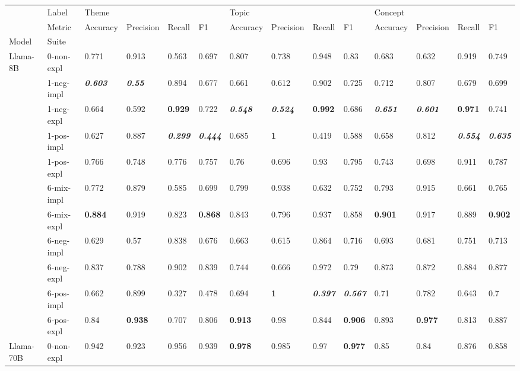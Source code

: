 \begin{tabular}{ll|llll|llll|llll}
\toprule
 & Label & \multicolumn{4}{l}{Theme} & \multicolumn{4}{l}{Topic} & \multicolumn{4}{l}{Concept} \\
 & Metric & Accuracy & Precision & Recall & F1 & Accuracy & Precision & Recall & F1 & Accuracy & Precision & Recall & F1 \\
Model & Suite &  &  &  &  &  &  &  &  &  &  &  &  \\
\midrule
\multirow[t]{11}{*}{Llama-8B} & 0-non-expl & 0.771 & 0.913 & 0.563 & 0.697 & 0.807 & 0.738 & 0.948 & 0.83 & 0.683 & 0.632 & 0.919 & 0.749 \\
 & 1-neg-impl & \bfseries \itshape 0.603 & \bfseries \itshape 0.55 & 0.894 & 0.677 & 0.661 & 0.612 & 0.902 & 0.725 & 0.712 & 0.807 & 0.679 & 0.699 \\
 & 1-neg-expl & 0.664 & 0.592 & \bfseries 0.929 & 0.722 & \bfseries \itshape 0.548 & \bfseries \itshape 0.524 & \bfseries 0.992 & 0.686 & \bfseries \itshape 0.651 & \bfseries \itshape 0.601 & \bfseries 0.971 & 0.741 \\
 & 1-pos-impl & 0.627 & 0.887 & \bfseries \itshape 0.299 & \bfseries \itshape 0.444 & 0.685 & \bfseries 1 & 0.419 & 0.588 & 0.658 & 0.812 & \bfseries \itshape 0.554 & \bfseries \itshape 0.635 \\
 & 1-pos-expl & 0.766 & 0.748 & 0.776 & 0.757 & 0.76 & 0.696 & 0.93 & 0.795 & 0.743 & 0.698 & 0.911 & 0.787 \\
 & 6-mix-impl & 0.772 & 0.879 & 0.585 & 0.699 & 0.799 & 0.938 & 0.632 & 0.752 & 0.793 & 0.915 & 0.661 & 0.765 \\
 & 6-mix-expl & \bfseries 0.884 & 0.919 & 0.823 & \bfseries 0.868 & 0.843 & 0.796 & 0.937 & 0.858 & \bfseries 0.901 & 0.917 & 0.889 & \bfseries 0.902 \\
 & 6-neg-impl & 0.629 & 0.57 & 0.838 & 0.676 & 0.663 & 0.615 & 0.864 & 0.716 & 0.693 & 0.681 & 0.751 & 0.713 \\
 & 6-neg-expl & 0.837 & 0.788 & 0.902 & 0.839 & 0.744 & 0.666 & 0.972 & 0.79 & 0.873 & 0.872 & 0.884 & 0.877 \\
 & 6-pos-impl & 0.662 & 0.899 & 0.327 & 0.478 & 0.694 & \bfseries 1 & \bfseries \itshape 0.397 & \bfseries \itshape 0.567 & 0.71 & 0.782 & 0.643 & 0.7 \\
 & 6-pos-expl & 0.84 & \bfseries 0.938 & 0.707 & 0.806 & \bfseries 0.913 & 0.98 & 0.844 & \bfseries 0.906 & 0.893 & \bfseries 0.977 & 0.813 & 0.887 \\
\midrule
\multirow[t]{11}{*}{Llama-70B} & 0-non-expl & 0.942 & 0.923 & 0.956 & 0.939 & \bfseries 0.978 & 0.985 & 0.97 & \bfseries 0.977 & 0.85 & 0.84 & 0.876 & 0.858 \\

\end{tabular}
